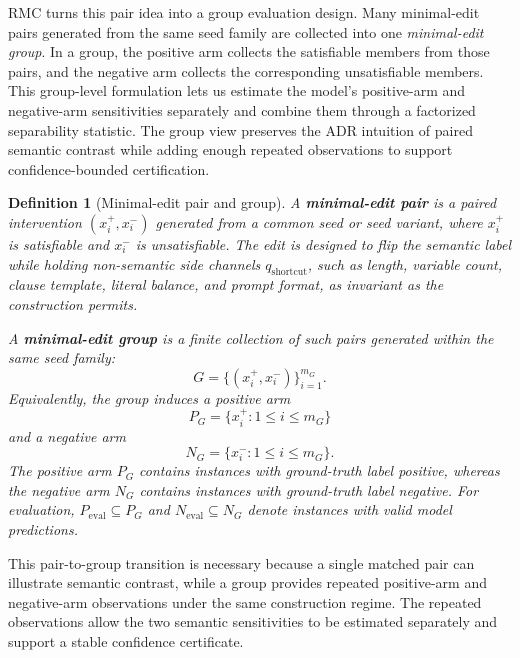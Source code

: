 \documentclass[conference]{IEEEtran}
\newtheorem{definition}{Definition}
\theoremstyle{remark}
\newcommand{\shortcutFac}{q_{\mathrm{shortcut}}}
\begin{document}
RMC turns this pair idea into a group evaluation design.  Many minimal-edit pairs generated from the same seed family are collected into one \emph{minimal-edit group}.  In a group, the positive arm collects the satisfiable members from those pairs, and the negative arm collects the corresponding unsatisfiable members.  This group-level formulation lets us estimate the model's positive-arm and negative-arm sensitivities separately and combine them through a factorized separability statistic.  The group view preserves the ADR intuition of paired semantic contrast while adding enough repeated observations to support confidence-bounded certification.

\begin{definition}[Minimal-edit pair and group]
\label{def:group}
A \textbf{minimal-edit pair} is a paired intervention
$(x_i^+,x_i^-)$ generated from a common seed or seed variant, where $x_i^+$ is
satisfiable and $x_i^-$ is unsatisfiable.
The edit is designed to flip the semantic label while holding non-semantic side
channels $\shortcutFac$, such as length, variable count, clause template,
literal balance, and prompt format, as invariant as the construction permits.

A \textbf{minimal-edit group} is a finite collection of such pairs generated
within the same seed family:
\begin{equation}\label{eq:minimal-edit-group}
G=\{(x_i^+,x_i^-)\}_{i=1}^{m_G}.
\end{equation}
Equivalently, the group induces a positive arm
\begin{equation}\label{eq:formula-06}
P_G=\{x_i^+:1\le i\le m_G\}
\end{equation}
and a negative arm
\begin{equation}\label{eq:formula-07}
N_G=\{x_i^-:1\le i\le m_G\}.
\end{equation}
The positive arm $P_G$ contains instances with ground-truth label positive, whereas
the negative arm $N_G$ contains instances with ground-truth label negative.
For evaluation, $P_{\mathrm{eval}}\subseteq P_G$ and
$N_{\mathrm{eval}}\subseteq N_G$ denote instances with valid model predictions.
\end{definition}

This pair-to-group transition is necessary because a single matched pair can illustrate semantic contrast, while a group provides repeated positive-arm and negative-arm observations under the same construction regime.  The repeated observations allow the two semantic sensitivities to be estimated separately and support a stable confidence certificate.
\end{document}
